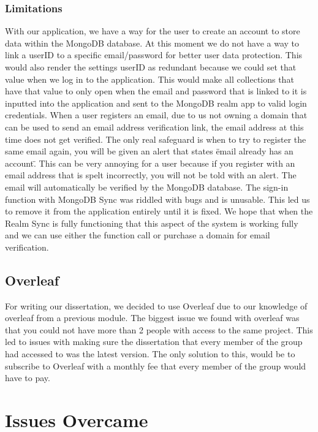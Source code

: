 \subsubsection{Limitations}
With our application, we have a way for the user to create an account to store data within the MongoDB database. At this moment we do not have a way to link a userID to a specific email/password for better user data protection. This would also render the settings userID as redundant because we could set that value when we log in to the application. This would make all collections that have that value to only open when the email and password that is linked to it is inputted into the application and sent to the MongoDB realm app to valid login credentials.
\newline
When a user registers an email, due to us not owning a domain that can be used to send an email address verification link, the email address at this time does not get verified. The only real safeguard is when to try to register the same email again, you will be given an alert that states \"email already has an account\". This can be very annoying for a user because if you register with an email address that is spelt incorrectly, you will not be told with an alert. The email will automatically be verified by the MongoDB database. The sign-in function with MongoDB Sync was riddled with bugs and is unusable. This led us to remove it from the application entirely until it is fixed. \newline We hope that when the Realm Sync is fully functioning that this aspect of the system is working fully and we can use either the function call or purchase a domain for email verification.
\subsection{Overleaf}
For writing our dissertation, we decided to use Overleaf due to our knowledge of overleaf from a previous module. The biggest issue we found with overleaf was that you could not have more than 2 people with access to the same project. This led to issues with making sure the dissertation that every member of the group had accessed to was the latest version. The only solution to this, would be to subscribe to Overleaf with a monthly fee that every member of the group would have to pay.  
\newline
\newline
\section {Issues Overcame}
